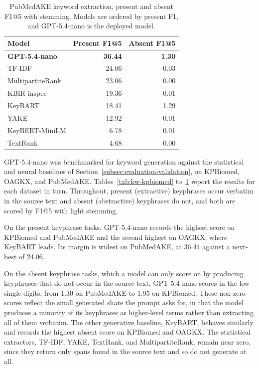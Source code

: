 
\begin{table}[t]
\caption{PubMedAKE keyword extraction, present and absent F1@5 with stemming. Models are ordered by present F1, and GPT-5.4-nano is the deployed model.}
\label{tab:kw-pubmedake}
\centering
\footnotesize
\begin{tabular}{@{}lrr@{}}
\toprule
Model & Present F1@5 & Absent F1@5 \\
\midrule
\textbf{GPT-5.4-nano} & \textbf{36.44} & \textbf{1.30} \\
TF-IDF & 24.06 & 0.03 \\
MultipartiteRank & 23.06 & 0.00 \\
KBIR-inspec & 19.36 & 0.01 \\
KeyBART & 18.41 & 1.29 \\
YAKE & 12.92 & 0.01 \\
KeyBERT-MiniLM & 6.78 & 0.01 \\
TextRank & 4.68 & 0.00 \\
\bottomrule
\end{tabular}
\end{table}


GPT-5.4-nano was benchmarked for keyword generation against the statistical and neural baselines of Section~\ref{subsec:evaluation-validation}, on KPBiomed, OAGKX, and PubMedAKE. Tables~\ref{tab:kw-kpbiomed} to~\ref{tab:kw-pubmedake} report the results for each dataset in turn. Throughout, present (extractive) keyphrases occur verbatim in the source text and absent (abstractive) keyphrases do not, and both are scored by F1@5 with light stemming.

On the present keyphrase tasks, GPT-5.4-nano records the highest score on KPBiomed and PubMedAKE and the second highest on OAGKX, where KeyBART leads. Its margin is widest on PubMedAKE, at 36.44 against a next-best of 24.06.

On the absent keyphrase tasks, which a model can only score on by producing keyphrases that do not occur in the source text, GPT-5.4-nano scores in the low single digits, from 1.30 on PubMedAKE to 1.95 on KPBiomed. These non-zero scores reflect the small generated share the prompt asks for, in that the model produces a minority of its keyphrases as higher-level terms rather than extracting all of them verbatim. The other generative baseline, KeyBART, behaves similarly and records the highest absent score on KPBiomed and OAGKX. The statistical extractors, TF-IDF, YAKE, TextRank, and MultipartiteRank, remain near zero, since they return only spans found in the source text and so do not generate at all.


